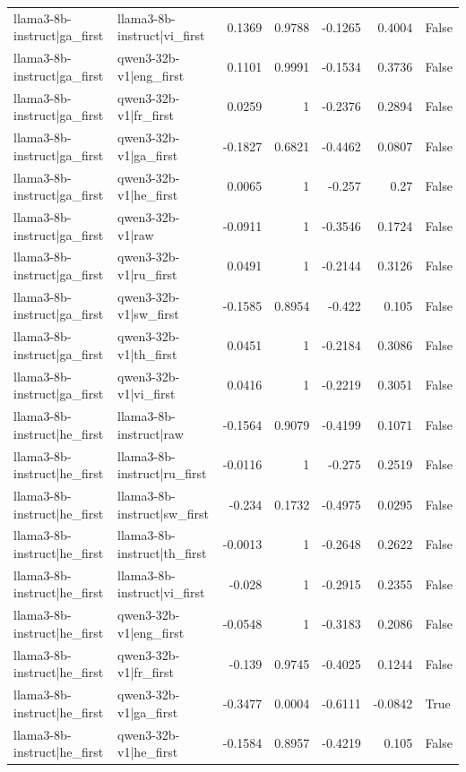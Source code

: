 \begin{table}
\begin{tabular}{l l r r r r l}
llama3-8b-instruct|ga_first & llama3-8b-instruct|vi_first & 0.1369 & 0.9788 & -0.1265 & 0.4004 & False \\
llama3-8b-instruct|ga_first & qwen3-32b-v1|eng_first & 0.1101 & 0.9991 & -0.1534 & 0.3736 & False \\
llama3-8b-instruct|ga_first & qwen3-32b-v1|fr_first & 0.0259 & 1 & -0.2376 & 0.2894 & False \\
llama3-8b-instruct|ga_first & qwen3-32b-v1|ga_first & -0.1827 & 0.6821 & -0.4462 & 0.0807 & False \\
llama3-8b-instruct|ga_first & qwen3-32b-v1|he_first & 0.0065 & 1 & -0.257 & 0.27 & False \\
llama3-8b-instruct|ga_first & qwen3-32b-v1|raw & -0.0911 & 1 & -0.3546 & 0.1724 & False \\
llama3-8b-instruct|ga_first & qwen3-32b-v1|ru_first & 0.0491 & 1 & -0.2144 & 0.3126 & False \\
llama3-8b-instruct|ga_first & qwen3-32b-v1|sw_first & -0.1585 & 0.8954 & -0.422 & 0.105 & False \\
llama3-8b-instruct|ga_first & qwen3-32b-v1|th_first & 0.0451 & 1 & -0.2184 & 0.3086 & False \\
llama3-8b-instruct|ga_first & qwen3-32b-v1|vi_first & 0.0416 & 1 & -0.2219 & 0.3051 & False \\
llama3-8b-instruct|he_first & llama3-8b-instruct|raw & -0.1564 & 0.9079 & -0.4199 & 0.1071 & False \\
llama3-8b-instruct|he_first & llama3-8b-instruct|ru_first & -0.0116 & 1 & -0.275 & 0.2519 & False \\
llama3-8b-instruct|he_first & llama3-8b-instruct|sw_first & -0.234 & 0.1732 & -0.4975 & 0.0295 & False \\
llama3-8b-instruct|he_first & llama3-8b-instruct|th_first & -0.0013 & 1 & -0.2648 & 0.2622 & False \\
llama3-8b-instruct|he_first & llama3-8b-instruct|vi_first & -0.028 & 1 & -0.2915 & 0.2355 & False \\
llama3-8b-instruct|he_first & qwen3-32b-v1|eng_first & -0.0548 & 1 & -0.3183 & 0.2086 & False \\
llama3-8b-instruct|he_first & qwen3-32b-v1|fr_first & -0.139 & 0.9745 & -0.4025 & 0.1244 & False \\
llama3-8b-instruct|he_first & qwen3-32b-v1|ga_first & -0.3477 & 0.0004 & -0.6111 & -0.0842 & True \\
llama3-8b-instruct|he_first & qwen3-32b-v1|he_first & -0.1584 & 0.8957 & -0.4219 & 0.105 & False \\

\end{tabular}
\end{table}
